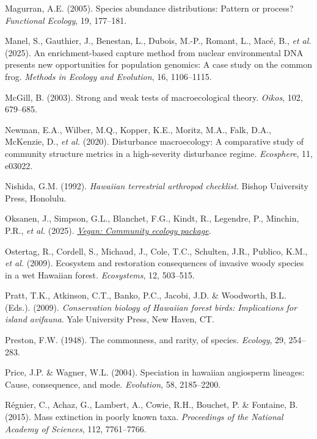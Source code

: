 \documentclass[
  letterpaper,
  DIV=11,
  numbers=noendperiod]{scrartcl}
\newlength{\cslhangindent}
\newenvironment{CSLReferences}[2] %
 {\begin{list}{}{%
  \setlength{\itemindent}{0pt}
  \setlength{\leftmargin}{0pt}
  \setlength{\parsep}{0pt}
  \ifodd #1
   \setlength{\leftmargin}{\cslhangindent}
   \setlength{\itemindent}{-1\cslhangindent}
  \fi
  \setlength{\itemsep}{#2\baselineskip}}}
 {\end{list}}
\begin{document}
\begin{CSLReferences}{1}{0}
Magurran, A.E. (2005). Species abundance distributions: Pattern or
process? \emph{Functional Ecology}, 19, 177--181.

Manel, S., Gauthier, J., Benestan, L., Dubois, M.-P., Romant, L., Macé,
B., \emph{et al.} (2025). An enrichment-based capture method from
nuclear environmental DNA presents new opportunities for population
genomics: A case study on the common frog. \emph{Methods in Ecology and
Evolution}, 16, 1106--1115.

McGill, B. (2003). Strong and weak tests of macroecological theory.
\emph{Oikos}, 102, 679--685.

Newman, E.A., Wilber, M.Q., Kopper, K.E., Moritz, M.A., Falk, D.A.,
McKenzie, D., \emph{et al.} (2020). Disturbance macroecology: A
comparative study of community structure metrics in a high-severity
disturbance regime. \emph{Ecosphere}, 11, e03022.

Nishida, G.M. (1992). \emph{Hawaiian terrestrial arthropod checklist}.
Bishop University Press, Honolulu.

Oksanen, J., Simpson, G.L., Blanchet, F.G., Kindt, R., Legendre, P.,
Minchin, P.R., \emph{et al.} (2025).
\emph{\href{https://CRAN.R-project.org/package=vegan}{Vegan: Community
ecology package}}.

Ostertag, R., Cordell, S., Michaud, J., Cole, T.C., Schulten, J.R.,
Publico, K.M., \emph{et al.} (2009). Ecosystem and restoration
consequences of invasive woody species in a wet {Hawaiian} forest.
\emph{Ecosystems}, 12, 503--515.

Pratt, T.K., Atkinson, C.T., Banko, P.C., Jacobi, J.D. \& Woodworth,
B.L. (Eds.). (2009). \emph{Conservation biology of {Hawaiian} forest
birds: Implications for island avifauna}. Yale University Press, New
Haven, CT.

Preston, F.W. (1948). The commonness, and rarity, of species.
\emph{Ecology}, 29, 254--283.

Price, J.P. \& Wagner, W.L. (2004). Speciation in hawaiian angiosperm
lineages: Cause, consequence, and mode. \emph{Evolution}, 58,
2185--2200.

Régnier, C., Achaz, G., Lambert, A., Cowie, R.H., Bouchet, P. \&
Fontaine, B. (2015). Mass extinction in poorly known taxa.
\emph{Proceedings of the National Academy of Sciences}, 112, 7761--7766.


\end{CSLReferences}
\end{document}
